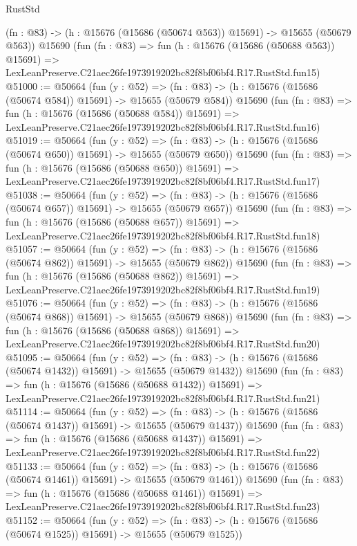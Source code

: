 \begin{lexlean}{RustStd}
\begin{coremodule}
    (fn : @83) -> (h : @15676 (@15686 (@50674 @563)) @15691) -> @15655 (@50679 @563))
    @15690
    (fun (fn : @83) =>
    fun (h : @15676 (@15686 (@50688 @563)) @15691) =>
    LexLeanPreserve.C21aec26fe1973919202bc82f8bf06bf4.R17.RustStd.fun15)
@51000 := @50664
    (fun (y : @52) =>
    (fn : @83) -> (h : @15676 (@15686 (@50674 @584)) @15691) -> @15655 (@50679 @584))
    @15690
    (fun (fn : @83) =>
    fun (h : @15676 (@15686 (@50688 @584)) @15691) =>
    LexLeanPreserve.C21aec26fe1973919202bc82f8bf06bf4.R17.RustStd.fun16)
@51019 := @50664
    (fun (y : @52) =>
    (fn : @83) -> (h : @15676 (@15686 (@50674 @650)) @15691) -> @15655 (@50679 @650))
    @15690
    (fun (fn : @83) =>
    fun (h : @15676 (@15686 (@50688 @650)) @15691) =>
    LexLeanPreserve.C21aec26fe1973919202bc82f8bf06bf4.R17.RustStd.fun17)
@51038 := @50664
    (fun (y : @52) =>
    (fn : @83) -> (h : @15676 (@15686 (@50674 @657)) @15691) -> @15655 (@50679 @657))
    @15690
    (fun (fn : @83) =>
    fun (h : @15676 (@15686 (@50688 @657)) @15691) =>
    LexLeanPreserve.C21aec26fe1973919202bc82f8bf06bf4.R17.RustStd.fun18)
@51057 := @50664
    (fun (y : @52) =>
    (fn : @83) -> (h : @15676 (@15686 (@50674 @862)) @15691) -> @15655 (@50679 @862))
    @15690
    (fun (fn : @83) =>
    fun (h : @15676 (@15686 (@50688 @862)) @15691) =>
    LexLeanPreserve.C21aec26fe1973919202bc82f8bf06bf4.R17.RustStd.fun19)
@51076 := @50664
    (fun (y : @52) =>
    (fn : @83) -> (h : @15676 (@15686 (@50674 @868)) @15691) -> @15655 (@50679 @868))
    @15690
    (fun (fn : @83) =>
    fun (h : @15676 (@15686 (@50688 @868)) @15691) =>
    LexLeanPreserve.C21aec26fe1973919202bc82f8bf06bf4.R17.RustStd.fun20)
@51095 := @50664
    (fun (y : @52) =>
    (fn : @83) -> (h : @15676 (@15686 (@50674 @1432)) @15691) -> @15655 (@50679 @1432))
    @15690
    (fun (fn : @83) =>
    fun (h : @15676 (@15686 (@50688 @1432)) @15691) =>
    LexLeanPreserve.C21aec26fe1973919202bc82f8bf06bf4.R17.RustStd.fun21)
@51114 := @50664
    (fun (y : @52) =>
    (fn : @83) -> (h : @15676 (@15686 (@50674 @1437)) @15691) -> @15655 (@50679 @1437))
    @15690
    (fun (fn : @83) =>
    fun (h : @15676 (@15686 (@50688 @1437)) @15691) =>
    LexLeanPreserve.C21aec26fe1973919202bc82f8bf06bf4.R17.RustStd.fun22)
@51133 := @50664
    (fun (y : @52) =>
    (fn : @83) -> (h : @15676 (@15686 (@50674 @1461)) @15691) -> @15655 (@50679 @1461))
    @15690
    (fun (fn : @83) =>
    fun (h : @15676 (@15686 (@50688 @1461)) @15691) =>
    LexLeanPreserve.C21aec26fe1973919202bc82f8bf06bf4.R17.RustStd.fun23)
@51152 := @50664
    (fun (y : @52) =>
    (fn : @83) -> (h : @15676 (@15686 (@50674 @1525)) @15691) -> @15655 (@50679 @1525))

\end{coremodule}
\end{lexlean}
